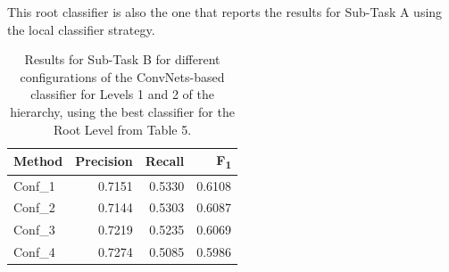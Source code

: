 \documentclass[11pt,a4paper]{article}
\begin{document}
This root classifier is also the one that reports the results for Sub-Task A
using the local classifier strategy.

\begin{table}[!h]
\begin{center}
\begin{tabular}{|l|r|r|r|}
\hline\centering\textbf{Method}  & \textbf{Precision} &  \textbf{Recall} &  \textbf{F\textsubscript{1}}\\
\hline
 Conf\_1 & 0.7151 & 0.5330 & 0.6108 \\
 Conf\_2 & 0.7144 & 0.5303 & 0.6087 \\
 Conf\_3 & 0.7219 & 0.5235 & 0.6069 \\
 Conf\_4 & 0.7274 & 0.5085 & 0.5986 \\
\hline
\end{tabular}
\end{center}
\caption{\label{devset-results} Results for Sub-Task B for different configurations of the ConvNets-based classifier for Levels 1 and 2 of the hierarchy, using the best classifier for the Root Level from Table 5.}
\end{table}
\end{document}
